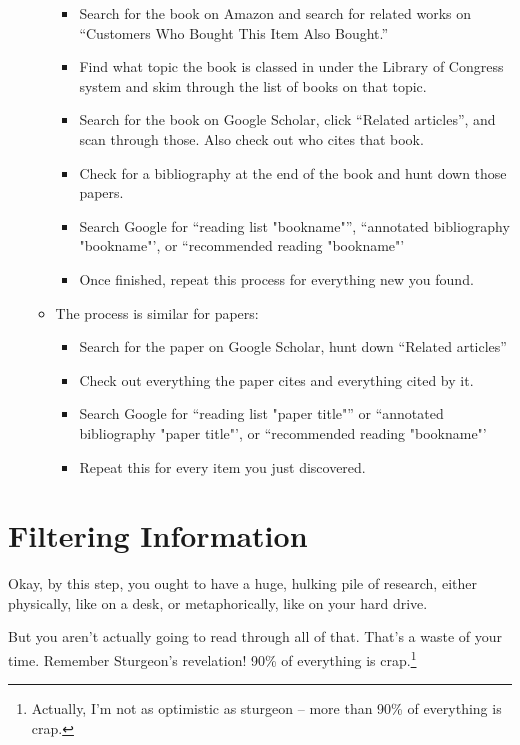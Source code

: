 \begin{enumerate}
\begin{itemize}
\begin{itemize}
    \item Search for the book on Amazon and search for related works on
      ``Customers Who Bought This Item Also Bought.''
    \item Find what topic the book is classed in under the Library of Congress
      system and skim through the list of books on that topic.
    \item Search for the book on Google Scholar, click ``Related articles'', and
      scan through those. Also check out who cites that book.
    \item Check for a bibliography at the end of the book and hunt down those
      papers.
    \item Search Google for ``reading list "bookname"'', ``annotated
      bibliography "bookname"', or ``recommended reading "bookname"'
    \item Once finished, repeat this process for everything new you found.
    \end{itemize}
  \item The process is similar for papers:
    \begin{itemize}
    \item Search for the paper on Google Scholar, hunt down ``Related articles''
    \item Check out everything the paper cites and everything cited by it.
    \item Search Google for ``reading list "paper title"'' or ``annotated
      bibliography "paper title"', or ``recommended reading "bookname"'
    \item Repeat this for every item you just discovered.
    \end{itemize}
  \end{itemize}
\end{enumerate}

\section{Filtering Information}

Okay, by this step, you ought to have a huge, hulking pile of research, either
physically, like on a desk, or metaphorically, like on your hard drive.

But you aren't actually going to read through all of that. That's a waste of
your time. Remember Sturgeon's revelation! 90\% of everything is
crap.\footnote{Actually, I'm not as optimistic as sturgeon -- more than 90\% of
  everything is crap.}

